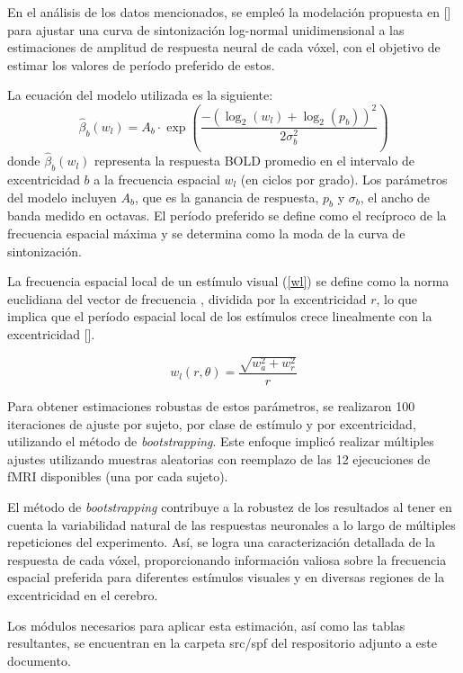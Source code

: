 En el análisis de los datos mencionados, se empleó la modelación propuesta en [\cite{broderick_mapping_2022}] para ajustar una curva de sintonización log-normal unidimensional a las estimaciones de amplitud de respuesta neural de cada v\'oxel, con el objetivo de estimar los valores de período preferido de estos.

La ecuación del modelo utilizada es la siguiente:
\begin{equation}
\hat{\beta}_b(w_l) = A_b \cdot \exp\left(\frac{-(\log_2(w_l) + \log_2(p_b))^2}{2\sigma_b^2}\right)
\end{equation}
donde \(\hat{\beta}_b(w_l)\) representa la respuesta BOLD promedio en el intervalo de excentricidad \(b\) a la frecuencia espacial \(w_l\) (en ciclos por grado). Los parámetros del modelo incluyen \(A_b\), que es la ganancia de respuesta, \(p_b\) y \(\sigma_b\), el ancho de banda medido en octavas. El período preferido se define como el recíproco de la frecuencia espacial máxima y se determina como la moda de la curva de sintonización.

La frecuencia espacial local de un est\'imulo visual (\ref{wl}) se define como la norma euclidiana del vector de frecuencia , dividida por la excentricidad  $r$, lo que implica que el período espacial local de los estímulos crece linealmente con la excentricidad [\cite{broderick_mapping_2022}].

\begin{equation}
	w_l(r,\theta) = \dfrac{\sqrt{w_a^2 + w_r^2}}{r} 
	\label{wl}
\end{equation}

Para obtener estimaciones robustas de estos parámetros, se realizaron 100 iteraciones de ajuste por sujeto, por clase de estímulo y por excentricidad, utilizando el método de \textit{bootstrapping}. Este enfoque implicó realizar múltiples ajustes utilizando muestras aleatorias con reemplazo de las 12 ejecuciones de fMRI disponibles (una por cada sujeto).

El método de \textit{bootstrapping} contribuye a la robustez de los resultados al tener en cuenta la variabilidad natural de las respuestas neuronales a lo largo de múltiples repeticiones del experimento. Así, se logra una caracterización detallada de la respuesta de cada v\'oxel, proporcionando información valiosa sobre la frecuencia espacial preferida para diferentes estímulos visuales y en diversas regiones de la excentricidad en el cerebro.

Los m\'odulos necesarios para aplicar esta estimaci\'on, as\'i como las tablas resultantes, se encuentran en la carpeta src/spf del respositorio adjunto a este documento. 

